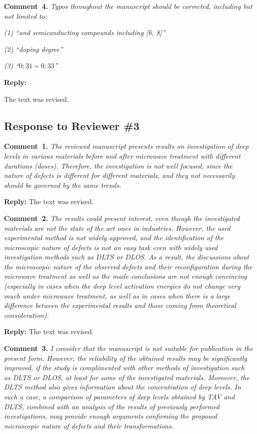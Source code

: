 \documentclass[10pt]{iopart}
\begin{document}
\vspace{1cm}
\noindent
\textcolor[rgb]{0.00,0.50,1.00}{\textbf{Comment~4.}}
\emph{Typos throughout the manuscript should be corrected, including but not limited to:}

\emph{(1) ``and semiconducting compounds including [6, 8]''}

\emph{(2) ``doping degree''}

\emph{(3) ``$0:31\div0:33$''}

\noindent
\textcolor[rgb]{0.51,0.00,0.00}{\textbf{Reply:}}

The text was revised.


\subsection*{Response to Reviewer \#3 }
\noindent
\textcolor[rgb]{0.00,0.50,1.00}{\textbf{Comment~1.}}
\emph{The reviewed manuscript presents results on investigation of deep levels
in various materials before and after microwave treatment with different durations (doses).
Therefore, the investigation is not well focused, since the nature of defects is different
for different materials, and they not necessarily should be governed by the same trends. }

\noindent
\textcolor[rgb]{0.51,0.00,0.00}{\textbf{Reply:}}
The text was revised.


\vspace{1cm}
\noindent
\textcolor[rgb]{0.00,0.50,1.00}{\textbf{Comment~2.}}
\emph{The results could present interest, even though the investigated materials are not the state of the art ones in industries.
However, the used experimental method is not widely approved,
and the identification of the microscopic nature of defects is not an easy
task even with widely used investigation methods such as DLTS or DLOS.
As a result, the discussions about the microscopic nature of the observed defects
and their reconfiguration during the microwave treatment
as well as the made conclusions are not enough convincing
(especially in cases when the deep level activation
energies do not change very much under microwave treatment,
as well as in cases when there is a large difference
between the experimental results and those coming from theoretical consideration).}

\noindent
\textcolor[rgb]{0.51,0.00,0.00}{\textbf{Reply:}}
The text was revised.

\vspace{1cm}
\noindent
\textcolor[rgb]{0.00,0.50,1.00}{\textbf{Comment~3.}}
\emph{I consider that the manuscript is not suitable for publication in the present form.
However, the reliability of the obtained results may be significantly improved,
if the study is complimented with other methods of investigation such as DLTS or DLOS,
at least for some of the investigated materials.
Moreover, the DLTS method also gives information about the concentration of deep levels.
In such a case, a comparison of parameters of deep levels obtained by TAV and DLTS,
combined with an analysis of the results of previously performed investigations,
may provide enough arguments confirming the
proposed microscopic nature of defects and their transformations.}
\end{document}
